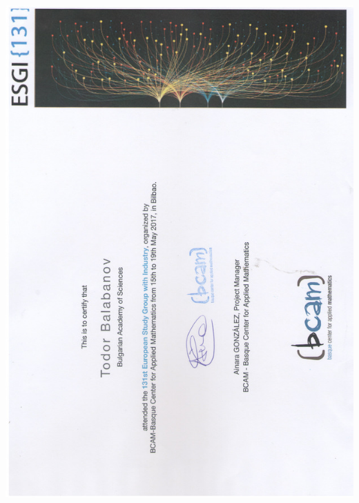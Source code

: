 \documentclass[english,a4paper]{europasscv}
\begin{document}
\includegraphics[width=\textwidth,height=\textheight,keepaspectratio]{131ESGI2017}
\end{document}
